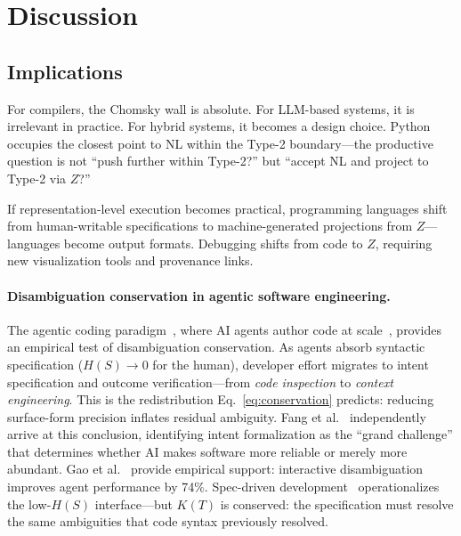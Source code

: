 \documentclass[11pt]{article}
\theoremstyle{definition}
\begin{document}

\section{Discussion}

\subsection{Implications}

For compilers, the Chomsky wall is absolute. For LLM-based systems, it is irrelevant in practice. For hybrid systems, it becomes a design choice. Python occupies the closest point to NL within the Type-2 boundary---the productive question is not ``push further within Type-2?'' but ``accept NL and project to Type-2 via $Z$?''

If representation-level execution becomes practical, programming languages shift from human-writable specifications to machine-generated projections from $Z$---languages become output formats. Debugging shifts from code to $Z$, requiring new visualization tools and provenance links.

\paragraph{Disambiguation conservation in agentic software engineering.}
The agentic coding paradigm~\cite{hassan2025agentic}, where AI agents author code at scale~\cite{li2025rise,anthropic2026agentictrends}, provides an empirical test of disambiguation conservation. As agents absorb syntactic specification ($H(S) \to 0$ for the human), developer effort migrates to intent specification and outcome verification---from \emph{code inspection} to \emph{context engineering}. This is the redistribution Eq.~\ref{eq:conservation} predicts: reducing surface-form precision inflates residual ambiguity. Fang et al.~\cite{fang2026intentformalization} independently arrive at this conclusion, identifying intent formalization as the ``grand challenge'' that determines whether AI makes software more reliable or merely more abundant. Gao et al.~\cite{gao2026ambigswe} provide empirical support: interactive disambiguation improves agent performance by 74\%. Spec-driven development~\cite{piskala2026sdd,stoica2024specifications} operationalizes the low-$H(S)$ interface---but $K(T)$ is conserved: the specification must resolve the same ambiguities that code syntax previously resolved.
\end{document}
